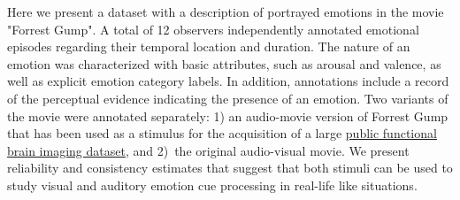 Here we present a dataset with a description of portrayed emotions in the movie
"Forrest Gump". A total of 12 observers independently annotated emotional
episodes regarding their temporal location and duration. The nature of an
emotion was characterized with basic attributes, such as arousal and valence,
as well as explicit emotion category labels. In addition, annotations include a
record of the perceptual evidence indicating the presence of an emotion. Two
variants of the movie were annotated separately: 1) an audio-movie version of
Forrest Gump that has been used as a stimulus for the acquisition of a large
\href{http://studyforrest.org}{public functional brain imaging dataset}, and
2)~the original audio-visual movie. We present reliability and consistency
estimates that suggest that both stimuli can be used to study visual and
auditory emotion cue processing in real-life like situations.
